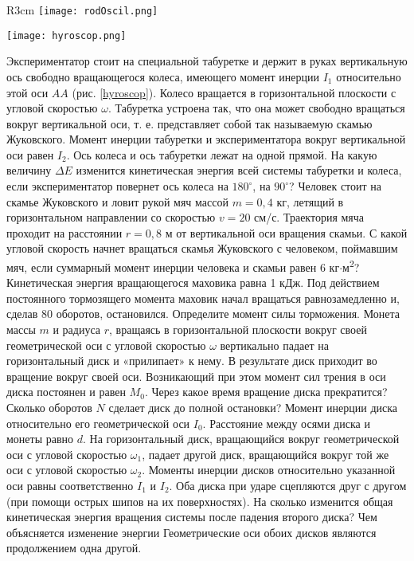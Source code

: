 \begin{wrapfigure}[25]{R}{3cm}
\texttt{[image: rodOscil.png]}
\caption{}
\label{rodOscil}
\texttt{[image: hyroscop.png]}
\caption{}
\label{hyroscop}
\end{wrapfigure}
\AddProb Экспериментатор стоит на специальной табуретке и держит в руках вертикальную ось свободно вращающегося колеса, имеющего момент инерции $I_1$ относительно этой оси $AA$ (рис. \ref{hyroscop}). Колесо вращается в горизонтальной плоскости
с угловой скоростью $\omega$. Табуретка устроена так, что она может свободно вращаться вокруг вертикальной оси, т. е. представляет собой так называемую скамью Жуковского. Момент инерции табуретки и экспериментатора вокруг вертикальной
оси равен $I_2$. Ось колеса и ось табуретки лежат на одной прямой. На какую величину $\Delta E$ изменится кинетическая энергия всей системы табуретки и колеса, если экспериментатор повернет ось колеса на $180^{\circ}$, на $90^{\circ}$?
\AddProb Человек стоит на скамье Жуковского и ловит рукой мяч массой $m = 0,4$ кг, летящий в горизонтальном направлении со скоростью $v = 20$ см/с. Траектория мяча проходит на расстоянии $r=0,8$ м от вертикальной оси вращения скамьи. С какой угловой скорость начнет вращаться скамья Жуковского с человеком, поймавшим мяч, если суммарный момент инерции человека и скамьи равен 6 кг$\cdot$м\textsuperscript{2}?
\AddProb Кинетическая энергия вращающегося маховика равна 1 кДж. Под действием постоянного тормозящего момента маховик начал вращаться равнозамедленно и, сделав 80 оборотов, остановился. Определите момент силы торможения.
\AddProb Монета массы $m$ и радиуса $r$, вращаясь в горизонтальной
плоскости вокруг своей геометрической оси с угловой скоростью $\omega$ вертикально падает на горизонтальный диск и «прилипает» к нему. В результате диск приходит во вращение вокруг своей оси. Возникающий при этом момент сил трения в оси диска постоянен и равен $M_0$. Через какое время вращение диска прекратится? Сколько оборотов $N$ сделает диск до полной остановки? Момент инерции диска относительно его геометрической оси $I_0$. Расстояние между осями диска и монеты равно $d$.
\AddProb На горизонтальный диск, вращающийся вокруг геометрической оси с угловой скоростью $\omega_1$, падает другой диск, вращающийся вокруг той же оси с угловой скоростью $\omega_2$. Моменты инерции дисков относительно указанной оси равны соответственно $I_1$ и $I_2$. Оба диска при ударе сцепляются друг с другом (при помощи острых шипов на их поверхностях). На сколько изменится общая кинетическая энергия вращения системы после падения второго диска? Чем объясняется изменение энергии Геометрические оси обоих дисков являются продолжением одна другой.
